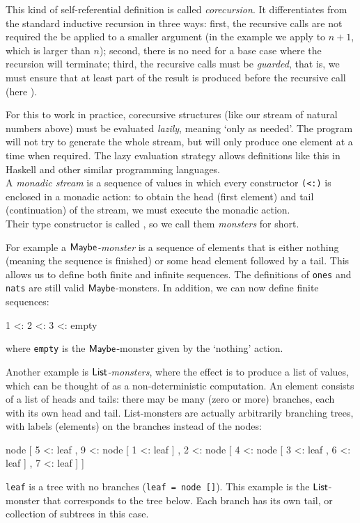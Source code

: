 This kind of self-referential definition is called \emph{corecursion}.
It differentiates from the standard inductive recursion in three ways:
first, the recursive calls are not required the be applied to a smaller argument (in the example we apply  to $n+1$, which is larger than $n$);
second, there is no need for a base case where the recursion will terminate;
third, the recursive calls must be {\em guarded}, that is, we must ensure that at least part of the result is produced before the recursive call (here ).

For this to work in practice, corecursive structures (like our stream of natural numbers above) must be evaluated \emph{lazily}, meaning `only as needed'. 
The program will not try to generate the whole stream, but will only produce one element at a time when required.
The lazy evaluation strategy allows definitions like this in Haskell and other similar programming languages. \\
  
A \emph{monadic stream} is a sequence of values in which every constructor \verb+(<:)+ is enclosed in a monadic action: to obtain the head (first element) and tail (continuation) of the stream, we must execute the monadic action. \\
Their type constructor is called , so we call them \emph{monsters} for short.

For example a \emph{$\mathsf{Maybe}$-monster} is a sequence of elements that is either nothing (meaning the sequence is finished) or some head element followed by a tail. This allows us to define both finite and infinite sequences. The definitions of \verb+ones+ and \verb+nats+ are still valid $\mathsf{Maybe}$-monsters. In addition, we can now define finite sequences:
\begin{haskell}
  1 <: 2 <: 3 <: empty
\end{haskell}
where \verb+empty+ is the $\mathsf{Maybe}$-monster given by the `nothing' action. 

Another example is \emph{$\mathsf{List}$-monsters}, where the effect is to produce a list of values, which can be thought of as a non-deterministic computation. An element consists of a list of heads and tails: there may be many (zero or more) branches, each with its own head and tail.
List-monsters are actually arbitrarily branching trees, with labels (elements) on the branches instead of the nodes:
\begin{haskell}
node [ 5 <: leaf
     , 9 <: node [ 1 <: leaf
                 ]
     , 2 <: node [ 4 <: node [ 3 <: leaf
                             , 6 <: leaf
                             ]
                 , 7 <: leaf
                 ]
     ]
\end{haskell}
\verb+leaf+ is a tree with no branches (\verb+leaf = node []+). This example is the $\mathsf{List}$-monster that corresponds to the tree below. Each branch has its own tail, or collection of subtrees in this case. \\

